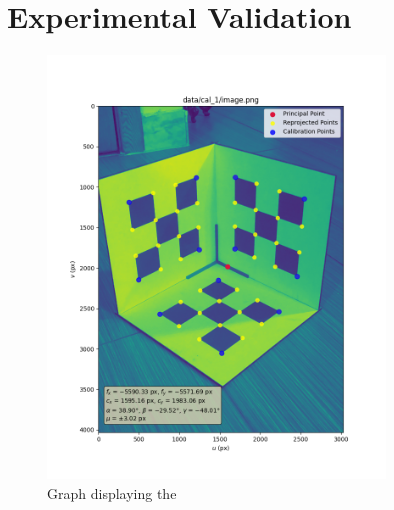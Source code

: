 \section{Experimental Validation}

\begin{figure}[H]
    \centering
    \includegraphics[width=0.8\textwidth]{assets/figures/cal_1}
    \caption{Graph displaying the }
\end{figure}
